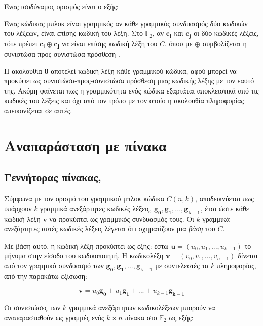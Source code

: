 Ένας ισοδύναμος ορισμός είναι ο εξής:

\begin{definition}
Ένας κώδικας μπλοκ είναι γραμμικός αν κάθε γραμμικός συνδυασμός δύο κωδικών του λέξεων, είναι επίσης κωδική του λέξη. Στο $\mathbb{F}_2$, αν $\mathbf{c_i}$ και $\mathbf{c_j}$ οι δύο κωδικές λέξεις, τότε πρέπει $\mathbf{c_i}\oplus\mathbf{c_j}$ να είναι επίσης κωδική λέξη του $C$, όπου με $\oplus$ συμβολίζεται η συνιστώσα-προς-συνιστώσα  πρόσθεση \cite{proakis1994communication}.
\end{definition}

Η ακολουθία \textbf{0} αποτελεί κωδική λέξη κάθε γραμμικού  κώδικα, αφού μπορεί να προκύψει ως συνιστώσα-προς-συνιστώσα  πρόσθεση μιας κωδικής λέξης με τον εαυτό της. Ακόμη φαίνεται πως η γραμμικότητα ενός κώδικα εξαρτάται αποκλειστικά από τις κωδικές του λέξεις και όχι από τον τρόπο με τον οποίο η ακολουθία πληροφορίας απεικονίζεται σε αυτές.

\section{Αναπαράσταση με πίνακα}

\subsection{Γεννήτορας πίνακας, }
Σύμφωνα με τον ορισμό του γραμμικού μπλοκ κώδικα $C(n,k)$, αποδεικνύεται πως υπάρχουν $k$ γραμμικά ανεξάρτητες κωδικές λέξεις, $\mathbf{g_0, g_1, ..., g_{k-1}}$, έτσι ώστε κάθε κωδική λέξη $\mathbf{v}$ να προκύπτει ως γραμμικός συνδυασμός τους. Οι $k$ γραμμικά ανεξάρτητες αυτές κωδικές λέξεις λέγεται ότι σχηματίζουν μια \textit{βάση} του $C$.

Με βάση αυτό, η κωδική λέξη προκύπτει ως εξής: έστω $\mathbf{u} = (u_0, u_1, ..., u_{k-1})$ το μήνυμα στην είσοδο του κωδικοποιητή. Η κωδικολέξη $\mathbf{v} = (v_0, v_1, ..., v_{n-1})$ δίνεται από τον γραμμικό συνδυασμό των $\mathbf{g_0, g_1, ..., g_{k-1}}$ με συντελεστές τα $k$  πληροφορίας, από την παρακάτω εξίσωση:

\begin{equation}
\mathbf{v}=u_0\mathbf{g_0}+u_1\mathbf{g_1}+...+u_{k-1}\mathbf{g_{k-1}}
\label{eq:codeword formation}
\end{equation}

Οι συνιστώσες των $k$ γραμμικά ανεξάρτητων κωδικολέξεων μπορούν να αναπαρασταθούν ως γραμμές ενός $k\times n$ πίνακα στο $\mathbb{F}_2$ ως εξής:

